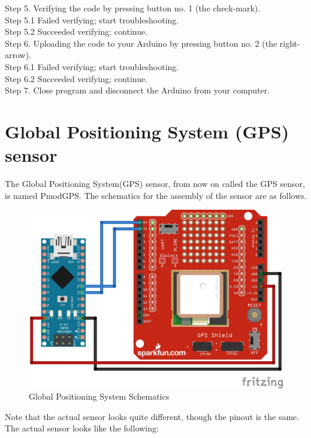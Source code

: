 \documentclass{report}
\begin{document}
Step 5. Verifying the code by pressing button no. 1 (the check-mark). \\
Step 5.1 Failed verifying; start troubleshooting. \\
Step 5.2 Succeeded verifying; continue. \\
Step 6. Uploading the code to your Arduino by pressing button no. 2 (the right-arrow). \\
Step 6.1 Failed verifying; start troubleshooting. \\
Step 6.2 Succeeded verifying; continue. \\
Step 7. Close program and disconnect the Arduino from your computer. \\

\chapter{Global Positioning System (GPS) sensor}
The Global Positioning System(GPS) sensor, from now on called the GPS sensor, is named PmodGPS. The schematics for the assembly of the sensor are as follows. \\

\begin{figure}[H]
\begin{center}
\includegraphics[scale=1]{images/GPS.jpg}
\caption{Global Positioning System Schematics}	
\end{center}
\end{figure}

Note that the actual sensor looks quite different, though the pinout is the same.\\

The actual sensor looks like the following:\\
\end{document}
